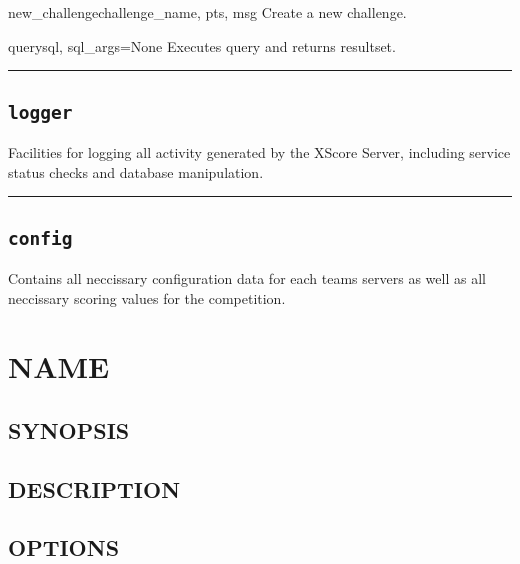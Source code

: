 \documentclass[letterpaper,10pt,english]{manual}
\begin{document}
\hypertarget{xscore.scores.new_challenge}{}\begin{funcdesc}{new\_challenge}{challenge\_name, pts, msg}
Create a new challenge.
\end{funcdesc}

\hypertarget{xscore.scores.query}{}\begin{funcdesc}{query}{sql, sql\_args=None}
Executes query and returns resultset.
\end{funcdesc}


\bigskip\hrule{}\bigskip



\section{\texttt{logger}}
\hypertarget{module-xscore.logger}{}
\modulesynopsis{}
Facilities for logging all activity generated by the
XScore Server, including service status checks and
database manipulation.


\bigskip\hrule{}\bigskip



\section{\texttt{config}}
\hypertarget{module-xscore.config}{}
\modulesynopsis{}
Contains all neccissary configuration data 
for each teams servers as well as all neccissary
scoring values for the competition.

\resetcurrentobjects
\hypertarget{--doc-xscored}{}

\chapter{NAME}


\section{SYNOPSIS}


\section{DESCRIPTION}


\section{OPTIONS}
\end{document}
